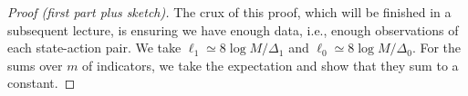 \documentclass[11pt]{article}
\begin{document}
\begin{proof}[Proof (first part plus sketch)]
	The crux of this proof, which will be finished in a subsequent lecture, is ensuring we have enough data, i.e., enough observations of each state-action pair. We take $\ell_{1}\simeq 8\log M / \Delta_{1}$ and $\ell_{0} \simeq 8\log M / \Delta_{0}$. For the sums over $m$ of indicators, we take the expectation and show that they sum to a constant.
\end{proof}




\end{document}
